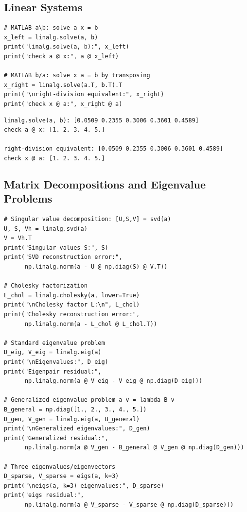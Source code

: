 \documentclass[11pt]{article}
\begin{document}
\subsection{Linear Systems}

\begin{lstlisting}[style=python]
# MATLAB a\b: solve a x = b
x_left = linalg.solve(a, b)
print("linalg.solve(a, b):", x_left)
print("check a @ x:", a @ x_left)

# MATLAB b/a: solve x a = b by transposing
x_right = linalg.solve(a.T, b.T).T
print("\nright-division equivalent:", x_right)
print("check x @ a:", x_right @ a)
\end{lstlisting}

\begin{lstlisting}[style=terminal]
linalg.solve(a, b): [0.0509 0.2355 0.3006 0.3601 0.4589]
check a @ x: [1. 2. 3. 4. 5.]

right-division equivalent: [0.0509 0.2355 0.3006 0.3601 0.4589]
check x @ a: [1. 2. 3. 4. 5.]
\end{lstlisting}

\subsection{Matrix Decompositions and Eigenvalue Problems}

\begin{lstlisting}[style=python]
# Singular value decomposition: [U,S,V] = svd(a)
U, S, Vh = linalg.svd(a)
V = Vh.T
print("Singular values S:", S)
print("SVD reconstruction error:",
      np.linalg.norm(a - U @ np.diag(S) @ V.T))

# Cholesky factorization
L_chol = linalg.cholesky(a, lower=True)
print("\nCholesky factor L:\n", L_chol)
print("Cholesky reconstruction error:",
      np.linalg.norm(a - L_chol @ L_chol.T))

# Standard eigenvalue problem
D_eig, V_eig = linalg.eig(a)
print("\nEigenvalues:", D_eig)
print("Eigenpair residual:",
      np.linalg.norm(a @ V_eig - V_eig @ np.diag(D_eig)))

# Generalized eigenvalue problem a v = lambda B v
B_general = np.diag([1., 2., 3., 4., 5.])
D_gen, V_gen = linalg.eig(a, B_general)
print("\nGeneralized eigenvalues:", D_gen)
print("Generalized residual:",
      np.linalg.norm(a @ V_gen - B_general @ V_gen @ np.diag(D_gen)))

# Three eigenvalues/eigenvectors
D_sparse, V_sparse = eigs(a, k=3)
print("\neigs(a, k=3) eigenvalues:", D_sparse)
print("eigs residual:",
      np.linalg.norm(a @ V_sparse - V_sparse @ np.diag(D_sparse)))
\end{lstlisting}
\end{document}
